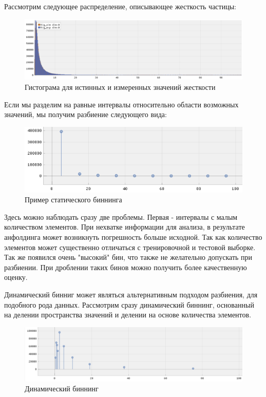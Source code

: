\documentclass[a4paper,12pt]{diplom}
\begin{document}
Рассмотрим следующее распределение, описывающее жесткость частицы:

\begin{figure}[h!]
   \centering
   \includegraphics[width=\linewidth]{images/rig_dist.png}
   \caption{Гистограма для истинных и измеренных значений жесткости}
   \label{photo:rig_dist}
\end{figure}

Если мы разделим на равные интервалы относительно области возможных значений, мы получим разбиение следующего вида:

\clearpage

\begin{figure}[h!]
   \centering
   \includegraphics[width=\linewidth]{images/rig_static_binning.png}
   \caption{Пример статического биннинга}
   \label{fig:coffee}
\end{figure}

Здесь можно наблюдать сразу две проблемы. Первая - интервалы с малым количеством элементов. При нехватке информации для анализа, в результате
анфолдинга может возникнуть погрешность больше исходной. Так как количество элементов может существенно отличаться с тренировочной и тестовой 
выборке. Так же появился очень "высокий" бин, что также не желательно допускать при разбиении. При дроблении таких бинов можно получить более 
качественную оценку.

Динамический бинниг может являться альтернативным подходом разбиения, для подобного рода данных. Рассмотрим сразу динамический биннинг, 
основанный на делении пространства значений и делении на основе количества элементов.

 \begin{figure}[h!]
   \centering
   \includegraphics[width=\linewidth]{images/rig_dynamic_binning.png}
   \caption{Динамический биннинг}
 \end{figure}
\end{document}
